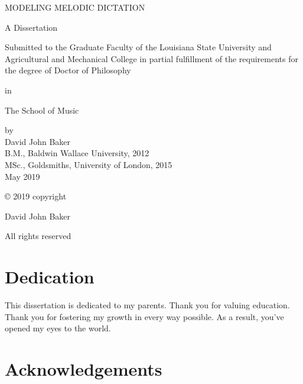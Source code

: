 \documentclass[12pt,]{book}
\title{}
\author{}
\date{2019-04-17}
\begin{document}
\newpage\thispagestyle{empty}
\begin{center}
MODELING MELODIC DICTATION
\end{center}
\vspace{1in}
\begin{center}
A Dissertation

Submitted to the Graduate Faculty of the Louisiana State University and Agricultural and Mechanical College in partial fulfillment of the requirements for the degree of Doctor of Philosophy

in

The School of Music
\end{center}
\vspace{1in}
\begin{center}
by\\
David John Baker\\
B.M., Baldwin Wallace University, 2012\\
MSc., Goldsmiths, University of London, 2015\\
May 2019
\end{center}


\setlength{\abovedisplayskip}{-5pt}
\setlength{\abovedisplayshortskip}{-5pt}



\cleardoublepage\newpage\thispagestyle{empty}\null
\cleardoublepage\newpage\thispagestyle{empty}\null

\thispagestyle{empty}

© 2019 copyright

David John Baker

All rights reserved

\cleardoublepage\newpage

\thispagestyle{empty}
\chapter{Dedication}

This dissertation is dedicated to my parents.
Thank you for valuing education.
Thank you for fostering my growth in every way possible.
As a result, you've opened my eyes to the world.

\setlength{\abovedisplayskip}{-5pt}
\setlength{\abovedisplayshortskip}{-5pt}

\chapter{Acknowledgements}
\end{document}
